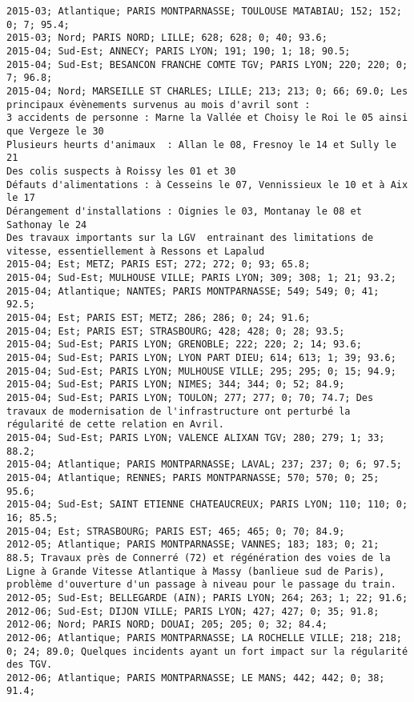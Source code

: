 \documentclass{article}
\begin{document}
\begin{Verbatim}[commandchars=\\\{\}]
2015-03; Atlantique; PARIS MONTPARNASSE; TOULOUSE MATABIAU; 152; 152; 0; 7; 95.4; 
2015-03; Nord; PARIS NORD; LILLE; 628; 628; 0; 40; 93.6; 
2015-04; Sud-Est; ANNECY; PARIS LYON; 191; 190; 1; 18; 90.5; 
2015-04; Sud-Est; BESANCON FRANCHE COMTE TGV; PARIS LYON; 220; 220; 0; 7; 96.8; 
2015-04; Nord; MARSEILLE ST CHARLES; LILLE; 213; 213; 0; 66; 69.0; Les principaux évènements survenus au mois d'avril sont :
3 accidents de personne : Marne la Vallée et Choisy le Roi le 05 ainsi que Vergeze le 30
Plusieurs heurts d'animaux  : Allan le 08, Fresnoy le 14 et Sully le 21
Des colis suspects à Roissy les 01 et 30
Défauts d'alimentations : à Cesseins le 07, Vennissieux le 10 et à Aix le 17
Dérangement d'installations : Oignies le 03, Montanay le 08 et Sathonay le 24
Des travaux importants sur la LGV  entrainant des limitations de vitesse, essentiellement à Ressons et Lapalud
2015-04; Est; METZ; PARIS EST; 272; 272; 0; 93; 65.8; 
2015-04; Sud-Est; MULHOUSE VILLE; PARIS LYON; 309; 308; 1; 21; 93.2; 
2015-04; Atlantique; NANTES; PARIS MONTPARNASSE; 549; 549; 0; 41; 92.5; 
2015-04; Est; PARIS EST; METZ; 286; 286; 0; 24; 91.6; 
2015-04; Est; PARIS EST; STRASBOURG; 428; 428; 0; 28; 93.5; 
2015-04; Sud-Est; PARIS LYON; GRENOBLE; 222; 220; 2; 14; 93.6; 
2015-04; Sud-Est; PARIS LYON; LYON PART DIEU; 614; 613; 1; 39; 93.6; 
2015-04; Sud-Est; PARIS LYON; MULHOUSE VILLE; 295; 295; 0; 15; 94.9; 
2015-04; Sud-Est; PARIS LYON; NIMES; 344; 344; 0; 52; 84.9; 
2015-04; Sud-Est; PARIS LYON; TOULON; 277; 277; 0; 70; 74.7; Des travaux de modernisation de l'infrastructure ont perturbé la régularité de cette relation en Avril.
2015-04; Sud-Est; PARIS LYON; VALENCE ALIXAN TGV; 280; 279; 1; 33; 88.2; 
2015-04; Atlantique; PARIS MONTPARNASSE; LAVAL; 237; 237; 0; 6; 97.5; 
2015-04; Atlantique; RENNES; PARIS MONTPARNASSE; 570; 570; 0; 25; 95.6; 
2015-04; Sud-Est; SAINT ETIENNE CHATEAUCREUX; PARIS LYON; 110; 110; 0; 16; 85.5; 
2015-04; Est; STRASBOURG; PARIS EST; 465; 465; 0; 70; 84.9; 
2012-05; Atlantique; PARIS MONTPARNASSE; VANNES; 183; 183; 0; 21; 88.5; Travaux près de Connerré (72) et régénération des voies de la Ligne à Grande Vitesse Atlantique à Massy (banlieue sud de Paris), problème d'ouverture d'un passage à niveau pour le passage du train.
2012-05; Sud-Est; BELLEGARDE (AIN); PARIS LYON; 264; 263; 1; 22; 91.6; 
2012-06; Sud-Est; DIJON VILLE; PARIS LYON; 427; 427; 0; 35; 91.8; 
2012-06; Nord; PARIS NORD; DOUAI; 205; 205; 0; 32; 84.4; 
2012-06; Atlantique; PARIS MONTPARNASSE; LA ROCHELLE VILLE; 218; 218; 0; 24; 89.0; Quelques incidents ayant un fort impact sur la régularité des TGV.
2012-06; Atlantique; PARIS MONTPARNASSE; LE MANS; 442; 442; 0; 38; 91.4; 

\end{Verbatim}
\end{document}
